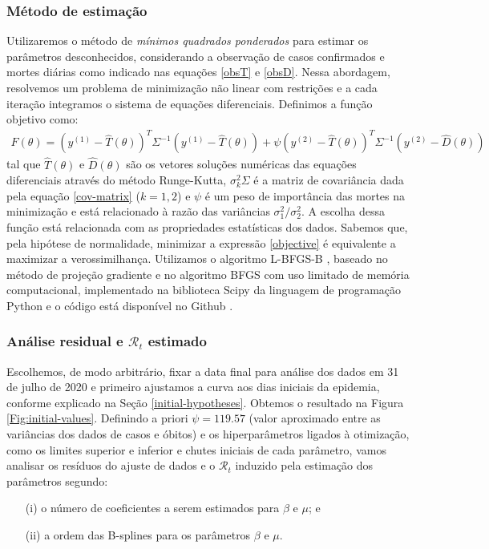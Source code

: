 \subsubsection{Método de estimação}
\label{estimation-method}

Utilizaremos o método de {\em mínimos quadrados ponderados} para estimar os parâmetros desconhecidos, considerando a observação de casos confirmados e mortes diárias como indicado nas equações \eqref{obsT} e \eqref{obsD}. 
Nessa abordagem, resolvemos um problema de minimização não linear com restrições e a cada iteração integramos o sistema de equações diferenciais. Definimos a função objetivo como:
\begin{gather}
\label{objective}
    F(\theta) = (y^{(1)} - \hat{T}(\theta))^T\Sigma^{-1}(y^{(1)} - \hat{T}(\theta)) + \psi(y^{(2)} - \hat{T}(\theta))^T\Sigma^{-1}(y^{(2)} - \hat{D}(\theta)) 
\end{gather}
tal que $\hat{T}(\theta)$ e $\hat{D}(\theta)$ são os vetores soluções
numéricas das equações diferenciais através do método Runge-Kutta,
$\sigma_k^2\Sigma$ é a matriz de covariância dada pela equação
\eqref{cov-matrix} ($k=1,2$) e $\psi$ é um peso de importância das mortes na
minimização e está relacionado à razão das variâncias $\sigma_1^2/\sigma_2^2$.
A escolha dessa função está relacionada com as propriedades estatísticas dos
dados. Sabemos que, pela hipótese de normalidade, minimizar a
expressão \ref{objective} é equivalente a maximizar a verossimilhança. 
Utilizamos o algoritmo L-BFGS-B \cite{byrd1995}, baseado no método de projeção gradiente e no algoritmo BFGS com uso limitado de memória computacional, implementado na biblioteca Scipy \cite{scipy} da linguagem de programação Python e o código está disponível no Github \cite{github}. 

\subsubsection{Análise residual e \texorpdfstring{$\mathcal{R}_t$}{Rt}
estimado}
\label{residual-analysis}

Escolhemos, de modo arbitrário, fixar a data final para análise dos dados em 31 de julho de 2020 e primeiro ajustamos a curva aos dias iniciais da epidemia, conforme explicado na Seção \ref{initial-hypotheses}. 
Obtemos o resultado na Figura \ref{Fig:initial-values}. 
Definindo a priori $\psi = 119.57$ (valor aproximado entre as variâncias dos dados de casos e óbitos) e os hiperparâmetros ligados à otimização, como os limites superior e inferior e chutes iniciais de cada parâmetro, vamos analisar os resíduos do ajuste de dados e o $\mathcal{R}_t$ induzido pela estimação dos parâmetros segundo: 
\begin{enumerate}
    \item[(i)] o número de coeficientes a serem estimados para $\beta$ e $\mu$; e 
    \item[(ii)] a ordem das B-splines para os parâmetros $\beta$ e $\mu$.
\end{enumerate}

